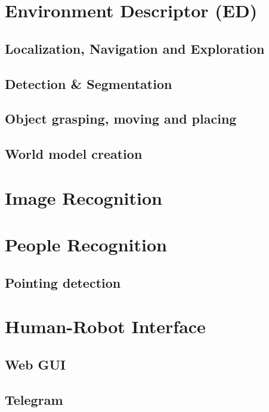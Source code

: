 \documentclass[runningheads,a4paper]{llncs}
\begin{document}
\section{Environment Descriptor (ED)}


\subsection{Localization, Navigation and Exploration}


\subsection{Detection \& Segmentation}


\subsection{Object grasping, moving and placing}


\subsection{World model creation}


\section{Image Recognition}


\section{People Recognition}

\subsection{Pointing detection}


\section{Human-Robot Interface}

\subsection{Web GUI}


\subsection{Telegram\texttrademark\hspace{0em}}

\end{document}
